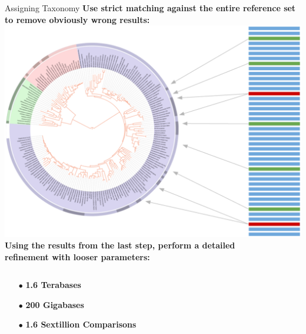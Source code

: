 \documentclass[final,t]{beamer}
\begin{document}
\begin{frame}{}
\begin{columns}[t]
\begin{column}{.3\linewidth}
        \begin{block}{Assigning Taxonomy}
            \textbf{Use strict matching against the entire reference set to remove obviously wrong results:}\\
            \includegraphics[width=.8\linewidth, right]{assets/Whole} \\
            \textbf{Using the results from the last step, perform a detailed\\ refinement with looser parameters:}
            \begin{columns}
                \begin{column}{.42\linewidth}
                    \begin{minipage}{\linewidth}
                        \begin{itemize}
                            \huge
                            \item[$\bullet$]\huge\textbf{1.6 Terabases}
                            \item[$\bullet$]\huge\textbf{200 Gigabases}
                            \item[$\bullet$]\huge\textbf{1.6 Sextillion Comparisons}
                        \end{itemize}
                    \end{minipage}
                \end{column}
                \begin{column}{.55\linewidth}
                    \begin{minipage}{\linewidth}

\end{minipage}
\end{column}
\end{columns}
\end{block}
\end{column}
\end{columns}
\end{frame}
\end{document}
